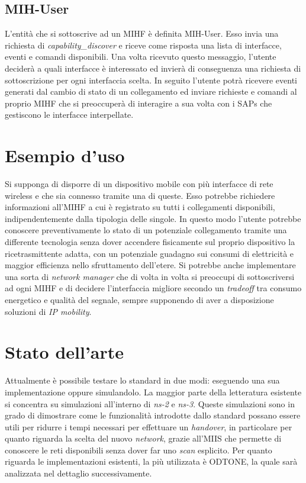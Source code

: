 \subsection{MIH-User}
L'entità che si sottoscrive ad un MIHF è definita MIH-User. Esso invia una richiesta di {\em capability\_discover} e riceve come risposta una lista di interfacce, eventi e comandi disponibili. Una volta ricevuto questo messaggio, l'utente deciderà a quali interfacce è interessato ed invierà di conseguenza una richiesta di sottoscrizione per ogni interfaccia scelta. In seguito l'utente potrà ricevere eventi generati dal cambio di stato di un collegamento ed inviare richieste e comandi al proprio MIHF che si preoccuperà di interagire a sua volta con i SAPs che gestiscono le interfacce interpellate.

\section{Esempio d'uso}
Si supponga di disporre di un dispositivo mobile con più interfacce di rete wireless e che sia connesso tramite una di queste. Esso potrebbe richiedere informazioni all'MIHF a cui è registrato su tutti i  collegamenti disponibili, indipendentemente dalla tipologia delle singole. In questo modo l'utente potrebbe conoscere preventivamente lo stato di un potenziale collegamento tramite una differente tecnologia senza dover accendere fisicamente sul proprio dispositivo la ricetrasmittente adatta, con un potenziale guadagno sui consumi di elettricità e maggior efficienza nello sfruttamento dell'etere. Si potrebbe anche implementare una sorta di {\em network manager} che di volta in volta si preoccupi di sottoscriversi ad ogni MIHF e di decidere l'interfaccia migliore secondo un {\em tradeoff} tra consumo energetico e qualità del segnale, sempre supponendo di aver a disposizione soluzioni di {\em IP mobility}.

\section{Stato dell'arte}
Attualmente è possibile testare lo standard in due modi: eseguendo una sua implementazione oppure simulandolo. La maggior parte della letteratura esistente si concentra su simulazioni all'interno di {\em ns-2}\cite{ns2} e {\em ns-3}\cite{ns3}. Queste simulazioni sono in grado di dimostrare come le funzionalità introdotte dallo standard possano essere utili per ridurre i tempi necessari per effettuare un {\em handover}\cite{master}, in particolare per quanto riguarda la scelta del nuovo {\em network}, grazie all'MIIS che permette di conoscere le reti disponibili senza dover far uno {\em scan} esplicito. Per quanto riguarda le implementazioni esistenti, la più utilizzata è ODTONE\cite{odtone}, la quale sarà analizzata nel dettaglio successivamente.